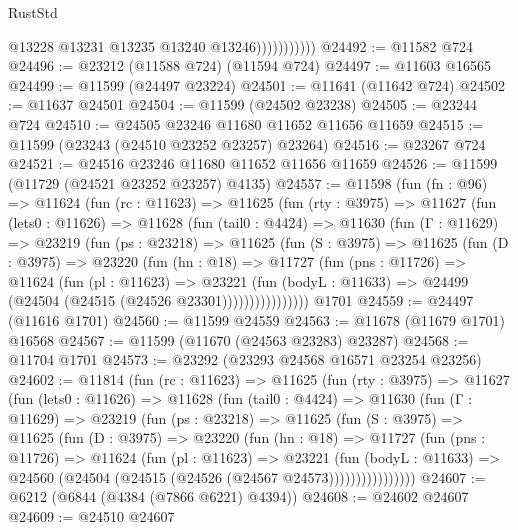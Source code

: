 \begin{lexlean}{RustStd}
\begin{coremodule}
                          @13228
                          @13231
                          @13235
                          @13240
                          @13246)))))))))))
@24492 := @11582 @724
@24496 := @23212 (@11588 @724) (@11594 @724)
@24497 := @11603 @16565
@24499 := @11599 (@24497 @23224)
@24501 := @11641 (@11642 @724)
@24502 := @11637 @24501
@24504 := @11599 (@24502 @23238)
@24505 := @23244 @724
@24510 := @24505 @23246 @11680 @11652 @11656 @11659
@24515 := @11599 (@23243 (@24510 @23252 @23257) @23264)
@24516 := @23267 @724
@24521 := @24516 @23246 @11680 @11652 @11656 @11659
@24526 := @11599 (@11729 (@24521 @23252 @23257) @4135)
@24557 := @11598
    (fun (fn : @96) =>
    @11624
      (fun (rc : @11623) =>
      @11625
        (fun (rty : @3975) =>
        @11627
          (fun (lets0 : @11626) =>
          @11628
            (fun (tail0 : @4424) =>
            @11630
              (fun (Γ : @11629) =>
              @23219
                (fun (ps : @23218) =>
                @11625
                  (fun (S : @3975) =>
                  @11625
                    (fun (D : @3975) =>
                    @23220
                      (fun (hn : @18) =>
                      @11727
                        (fun (pns : @11726) =>
                        @11624
                          (fun (pl : @11623) =>
                          @23221
                            (fun (bodyL : @11633) =>
                            @24499 (@24504 (@24515 (@24526 @23301))))))))))))))))
    @1701
@24559 := @24497 (@11616 @1701)
@24560 := @11599 @24559
@24563 := @11678 (@11679 @1701) @16568
@24567 := @11599 (@11670 (@24563 @23283) @23287)
@24568 := @11704 @1701
@24573 := @23292 (@23293 @24568 @16571 @23254 @23256)
@24602 := @11814
    (fun (rc : @11623) =>
    @11625
      (fun (rty : @3975) =>
      @11627
        (fun (lets0 : @11626) =>
        @11628
          (fun (tail0 : @4424) =>
          @11630
            (fun (Γ : @11629) =>
            @23219
              (fun (ps : @23218) =>
              @11625
                (fun (S : @3975) =>
                @11625
                  (fun (D : @3975) =>
                  @23220
                    (fun (hn : @18) =>
                    @11727
                      (fun (pns : @11726) =>
                      @11624
                        (fun (pl : @11623) =>
                        @23221
                          (fun (bodyL : @11633) =>
                          @24560 (@24504 (@24515 (@24526 (@24567 @24573))))))))))))))))
@24607 := @6212 (@6844 (@4384 (@7866 @6221) @4394))
@24608 := @24602 @24607
@24609 := @24510 @24607

\end{coremodule}
\end{lexlean}

